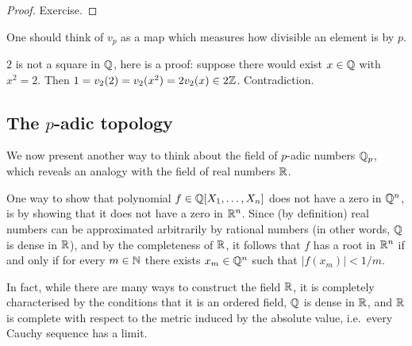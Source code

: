\documentclass[12pt, leqno, british]{amsart}
\begin{document}
\begin{proof}
Exercise.
\end{proof}
One should think of $v_p$ as a map which measures how divisible an element is by $p$.
\begin{eg}
$2$ is not a square in $\mathbb Q$, here is a proof: suppose there would exist $x \in \mathbb Q$ with $x^2 = 2$.
Then $1 = v_2(2) = v_2(x^2) = 2v_2(x) \in 2\mathbb Z$.
Contradiction.
\end{eg}

\subsection{The $p$-adic topology}
We now present another way to think about the field of $p$-adic numbers $\mathbb Q_p$, which reveals an analogy with the field of real numbers $\mathbb R$.

One way to show that polynomial $f \in \mathbb Q[X_1, \ldots, X_n]$ does not have a zero in $\mathbb Q^n$, is by showing that it does not have a zero in $\mathbb R^n$.
Since (by definition) real numbers can be approximated arbitrarily by rational numbers (in other words, $\mathbb Q$ is dense in $\mathbb R$), and by the completeness of $\mathbb R$, it follows that $f$ has a root in $\mathbb R^n$ if and only if for every $m \in \mathbb N$ there exists $x_m \in \mathbb Q^n$ such that $\lvert f(x_m) \rvert < 1/m$.

In fact, while there are many ways to construct the field $\mathbb R$, it is completely characterised by the conditions that it is an ordered field, $\mathbb Q$ is dense in $\mathbb R$, and $\mathbb R$ is complete with respect to the metric induced by the absolute value, i.e.~every Cauchy sequence has a limit.
\end{document}
